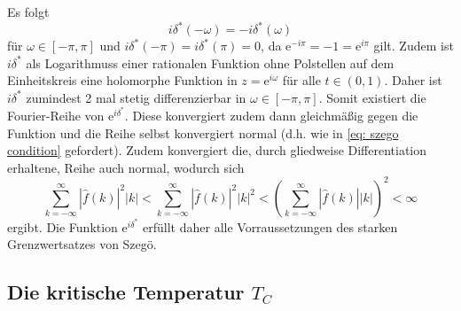 \noindent Es folgt
$$i\delta^*(-\omega) = -i\delta^*(\omega)$$
für $\omega \in \left[-\pi,\pi\right]$ und $i\delta^*(-\pi) =  i\delta^*(\pi) = 0$, da $\mathrm{e}^{-i \pi} = -1 = \mathrm{e}^{i \pi}$ gilt. 
Zudem ist $ i\delta^* $ als Logarithmuss einer rationalen Funktion ohne Polstellen auf dem Einheitskreis eine holomorphe Funktion in $z= \mathrm{e}^{i\omega}$ für alle $t \in (0,1)$. Daher ist $i\delta^*$ zumindest 2 mal stetig differenzierbar in $\omega \in \left[-\pi,\pi\right]$.  Somit existiert die Fourier-Reihe von $\mathrm{e}^{i\delta^*}$. Diese konvergiert zudem dann gleichmäßig gegen die Funktion und die Reihe selbst konvergiert normal (d.h. wie in \eqref{eq: szego condition} gefordert). Zudem konvergiert die, durch gliedweise Differentiation erhaltene, Reihe auch normal, wodurch sich
\begin{equation}
 \sum_{k = -\infty}^{\infty} |\hat{f}(k)|^2|k| < \sum_{k = -\infty}^{\infty} |\hat{f}(k)|^2|k|^2 < \left(\sum_{k = -\infty}^{\infty} |\hat{f}(k)||k|\right)^2 < \infty
\end{equation}
ergibt. Die Funktion $\mathrm{e}^{i\delta^*}$ erfüllt daher alle Vorraussetzungen des starken Grenzwertsatzes von Szegö.

\subsection{Die kritische Temperatur $T_C$}

